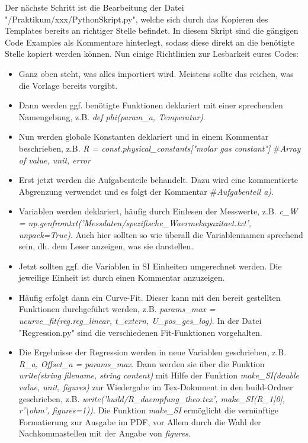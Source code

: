 Der nächste Schritt ist die Bearbeitung der Datei "/Praktikum/xxx/PythonSkript.py", welche sich durch das Kopieren des Templates bereits an richtiger Stelle befindet. In diesem Skript sind die gängigen Code Examples als Kommentare hinterlegt, sodass diese direkt an die benötigte Stelle kopiert werden können. Nun einige Richtlinien zur Lesbarkeit eures Codes:
\begin{itemize}
  \item Ganz oben steht, was alles importiert wird. Meistens sollte das reichen, was die Vorlage bereits vorgibt.
  \item Dann werden ggf. benötigte Funktionen deklariert mit einer sprechenden Namengebung, z.B. \emph{def phi(param\_a, Temperatur)}.
  \item Nun werden globale Konstanten deklariert und in einem Kommentar beschrieben, z.B. \emph{R = const.physical\_constants["molar gas constant"]} \#\emph{Array of value, unit, error}
  \item Erst jetzt werden die Aufgabenteile behandelt. Dazu wird eine kommentierte Abgrenzung verwendet und es folgt der Kommentar \#\emph{Aufgabenteil a)}.
  \item Variablen werden deklariert, häufig durch Einlesen der Messwerte, z.B. \emph{c\_W = np.genfromtxt('Messdaten/spezifische\_Waermekapazitaet.txt', unpack=True)}. Auch hier sollten so wie überall die Variablennamen sprechend sein, dh. dem Leser anzeigen, was sie darstellen.
  \item Jetzt sollten ggf. die Variablen in SI Einheiten umgerechnet werden. Die jeweilige Einheit ist durch einen Kommentar anzuzeigen.
  \item Häufig erfolgt dann ein Curve-Fit. Dieser kann mit den bereit gestellten Funktionen durchgeführt werden, z.B. \emph{params\_max = ucurve\_fit(reg.reg\_linear, t\_extern, U\_pos\_ges\_log)}. In der Datei "Regression.py" sind die verschiedenen Fit-Funktionen vorgehalten.
  \item Die Ergebnisse der Regression werden in neue Variablen geschrieben, z.B. \emph{R\_a, Offset\_a = params\_max}. Dann werden sie über die Funktion \emph{write(string filename, string content)} mit Hilfe der Funktion \emph{make\_SI(double value, unit, figures)} zur Wiedergabe im Tex-Dokument in den build-Ordner geschrieben, z.B. \emph{write('build/R\_daempfung\_theo.tex', make\_SI(R\_1[0], r'\textbackslash ohm', figures=1))}. Die Funktion \emph{make\_SI} ermöglicht die vernünftige Formatierung zur Ausgabe im PDF, vor Allem durch die Wahl der Nachkommastellen mit der Angabe von \emph{figures}.

\end{itemize}

